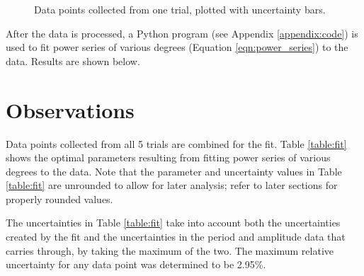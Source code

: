 \documentclass[aps,twocolumn,secnumarabic,nobalancelastpage,amsmath,amssymb,nofootinbib,floatfix]{revtex4}
\begin{document}
\begin{figure}[htb]
    \caption{Data points collected from one trial, plotted with uncertainty bars.}
    \label{fig:data1}
\end{figure}

After the data is processed, a Python program (see Appendix \ref{appendix:code}) is used to fit power series of various
degrees (Equation \ref{eqn:power_series}) to the data. Results are shown below.


\section{Observations}

Data points collected from all 5 trials are combined for the fit.
Table \ref{table:fit} shows the optimal parameters resulting from fitting power series of various degrees to the data.
Note that the parameter and uncertainty values in Table \ref{table:fit} are unrounded to allow for later analysis;
refer to later sections for properly rounded values.

The uncertainties in Table \ref{table:fit} take into account both the uncertainties created by the fit and the
uncertainties in the period and amplitude data that carries through, by taking the maximum of the two. The maximum
relative uncertainty for any data point was determined to be 2.95\%.
\end{document}
